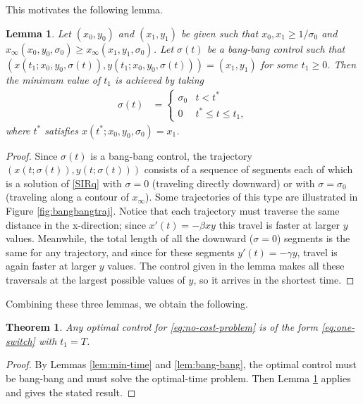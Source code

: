 \documentclass[english,12pt,letter]{article}
\newtheorem{thm}{Theorem}
\newtheorem{lem}{Lemma}
\newcommand{\Rnot}{\sigma_0}
\newcommand{\Sinf}{x_\infty}
\begin{document}
This motivates the following lemma.

\begin{lem} \label{lem:shortest-path}
Let $(x_0,y_0)$ and $(x_1,y_1)$ be given such that $x_0, x_1 \ge 1/\Rnot$ and
$\Sinf(x_0,y_0,\Rnot)\ge\Sinf(x_1,y_1,\Rnot)$.
Let $\sigma(t)$ be a bang-bang control such that $(x(t_1;x_0,y_0,\sigma(t)),y(t_1;x_0,y_0,\sigma(t)))=(x_1,y_1)$
for some $t_1\ge0$.  Then the minimum value of $t_1$ is achieved by taking
\begin{align} \label{eq:one-switch}
    \sigma(t) & = \begin{cases}
        \Rnot & t<t^* \\
        0 & t^* \le  t \le t_1,
    \end{cases}
\end{align}
where $t^*$ satisfies $x(t^*;x_0,y_0,\Rnot)=x_1$.
\end{lem}
\begin{proof}
Since $\sigma(t)$ is a bang-bang control, the trajectory $(x(t;\sigma(t)),y(t;\sigma(t)))$ 
consists of a sequence of segments each of which is a solution of
\eqref{SIRq} with $\sigma=0$ (traveling directly downward) or with $\sigma=\sigma_0$
(traveling along a contour of $x_\infty$).  Some trajectories of this type are
illustrated in Figure \ref{fig:bangbangtraj}.  Notice that each trajectory must
traverse the same distance in the x-direction; since $x'(t)=-\beta xy$ this
travel is faster at larger $y$ values.  Meanwhile, the total length of all the
downward ($\sigma=0$) segments is the same for any trajectory, and since for
these segments $y'(t) = -\gamma y$, travel is again faster at larger $y$ values.
The control given in the lemma makes all these traversals at the largest
possible values of $y$, so it arrives in the shortest time.
\end{proof}

Combining these three lemmas, we obtain the following.
\begin{thm} \label{thm:one-switch}
    Any optimal control for \eqref{eq:no-cost-problem} is of the form \eqref{eq:one-switch}
    with $t_1=T$.
\end{thm}
\begin{proof}
    By Lemmas \ref{lem:min-time} and \ref{lem:bang-bang}, the optimal control must be bang-bang and must solve
    the optimal-time problem.  Then Lemma \ref{lem:shortest-path} applies and gives the stated result.
\end{proof}
\end{document}
